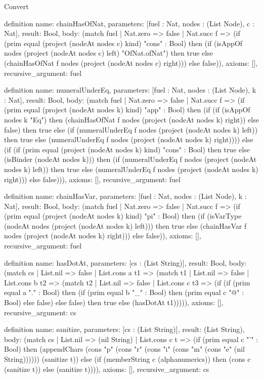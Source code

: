 \begin{lexlean}{Convert}
\begin{semanticmodule}
definition{
  name: chainHasOfNat,
  parameters: [fuel : Nat, nodes : (List Node), c : Nat],
  result: Bool,
  body: (match fuel
    | Nat.zero => false
    | Nat.succ f => (if (prim equal (project (nodeAt nodes c) kind) "cons" : Bool) then (if (isAppOf nodes (project (nodeAt nodes c) left) "OfNat.ofNat") then true else (chainHasOfNat f nodes (project (nodeAt nodes c) right))) else false)),
  axioms: [],
  recursive_argument: fuel
}

definition{
  name: numeralUnderEq,
  parameters: [fuel : Nat, nodes : (List Node), k : Nat],
  result: Bool,
  body: (match fuel
    | Nat.zero => false
    | Nat.succ f => (if (prim equal (project (nodeAt nodes k) kind) "app" : Bool) then (if (if (isAppOf nodes k "Eq") then (chainHasOfNat f nodes (project (nodeAt nodes k) right)) else false) then true else (if (numeralUnderEq f nodes (project (nodeAt nodes k) left)) then true else (numeralUnderEq f nodes (project (nodeAt nodes k) right)))) else (if (if (prim equal (project (nodeAt nodes k) kind) "cons" : Bool) then true else (isBinder (nodeAt nodes k))) then (if (numeralUnderEq f nodes (project (nodeAt nodes k) left)) then true else (numeralUnderEq f nodes (project (nodeAt nodes k) right))) else false))),
  axioms: [],
  recursive_argument: fuel
}

definition{
  name: chainHasVar,
  parameters: [fuel : Nat, nodes : (List Node), k : Nat],
  result: Bool,
  body: (match fuel
    | Nat.zero => false
    | Nat.succ f => (if (prim equal (project (nodeAt nodes k) kind) "pi" : Bool) then (if (isVarType (nodeAt nodes (project (nodeAt nodes k) left))) then true else (chainHasVar f nodes (project (nodeAt nodes k) right))) else false)),
  axioms: [],
  recursive_argument: fuel
}

definition{
  name: hasDotAt,
  parameters: [cs : (List String)],
  result: Bool,
  body: (match cs
    | List.nil => false
    | List.cons a t1 => (match t1
    | List.nil => false
    | List.cons b t2 => (match t2
    | List.nil => false
    | List.cons c t3 => (if (if (prim equal a "." : Bool) then (if (prim equal b "_" : Bool) then (prim equal c "@" : Bool) else false) else false) then true else (hasDotAt t1))))),
  axioms: [],
  recursive_argument: cs
}

definition{
  name: sanitize,
  parameters: [cs : (List String)],
  result: (List String),
  body: (match cs
    | List.nil => (nil String)
    | List.cons c t => (if (prim equal c "'" : Bool) then (appendChars (cons "p" (cons "r" (cons "i" (cons "m" (cons "e" (nil String)))))) (sanitize t)) else (if (memberString c (alphanumerics)) then (cons c (sanitize t)) else (sanitize t)))),
  axioms: [],
  recursive_argument: cs
}


\end{semanticmodule}
\end{lexlean}
